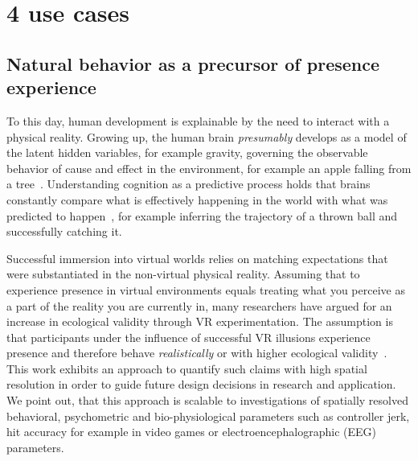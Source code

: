 \section{4 use cases}

\subsection{Natural behavior as a precursor of presence experience}
To this day, human development is explainable by the need to interact with a physical reality. Growing up, the human brain \textit{presumably} develops as a model of the latent hidden variables, for example gravity, governing the observable behavior of cause and effect in the environment, for example an apple falling from a tree~\cite{Friston2010}. Understanding cognition as a predictive process holds that brains constantly compare what is effectively happening in the world with what was predicted to happen~\cite{Clark2013}, for example inferring the trajectory of a thrown ball and successfully catching it. 

Successful immersion into virtual worlds relies on matching expectations that were substantiated in the non-virtual physical reality. Assuming that to experience presence in virtual environments equals treating what you perceive as a part of the reality you are currently in, many researchers have argued for an increase in ecological validity through VR experimentation. The assumption is that participants under the influence of successful VR illusions experience presence and therefore behave \textit{realistically} or with higher ecological validity~\cite{Tarr2002, Bohil2011, Parsons2015, Parsons2017}. This work exhibits an approach to quantify such claims with high spatial resolution in order to guide future design decisions in research and application. We point out, that this approach is scalable to investigations of spatially resolved behavioral, psychometric and bio-physiological parameters such as controller jerk, hit accuracy for example in video games or electroencephalographic (EEG) parameters.

